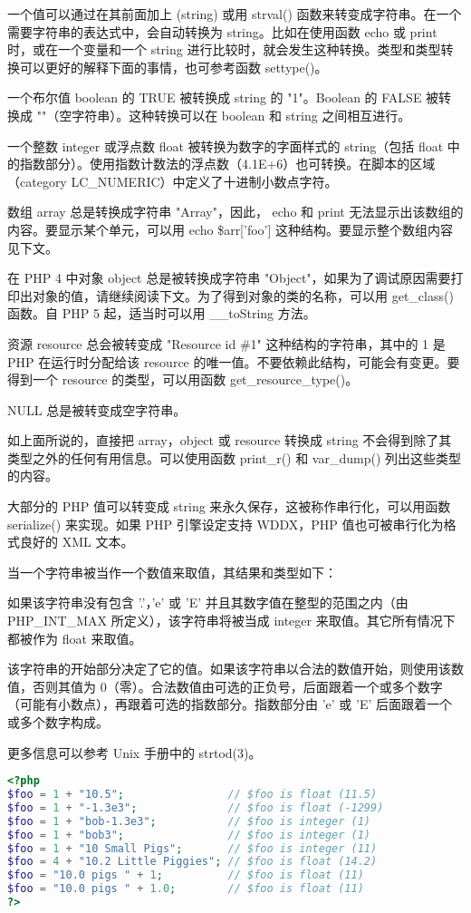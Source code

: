 一个值可以通过在其前面加上 (string) 或用 strval() 函数来转变成字符串。在一个需要字符串的表达式中，会自动转换为 string。比如在使用函数 echo 或 print 时，或在一个变量和一个 string 进行比较时，就会发生这种转换。类型和类型转换可以更好的解释下面的事情，也可参考函数 settype()。

一个布尔值 boolean 的 TRUE 被转换成 string 的 "1"。Boolean 的 FALSE 被转换成 ""（空字符串）。这种转换可以在 boolean 和 string 之间相互进行。

一个整数 integer 或浮点数 float 被转换为数字的字面样式的 string（包括 float 中的指数部分）。使用指数计数法的浮点数（4.1E+6）也可转换。在脚本的区域（category LC\_NUMERIC）中定义了十进制小数点字符。

数组 array 总是转换成字符串 "Array"，因此， echo 和 print 无法显示出该数组的内容。要显示某个单元，可以用 echo \$arr['foo'] 这种结构。要显示整个数组内容见下文。

在 PHP 4 中对象 object 总是被转换成字符串 "Object"，如果为了调试原因需要打印出对象的值，请继续阅读下文。为了得到对象的类的名称，可以用 get\_class() 函数。自 PHP 5 起，适当时可以用 \_\_toString 方法。

资源 resource 总会被转变成 "Resource id \#1" 这种结构的字符串，其中的 1 是 PHP 在运行时分配给该 resource 的唯一值。不要依赖此结构，可能会有变更。要得到一个 resource 的类型，可以用函数 get\_resource\_type()。

NULL 总是被转变成空字符串。

如上面所说的，直接把 array，object 或 resource 转换成 string 不会得到除了其类型之外的任何有用信息。可以使用函数 print\_r() 和 var\_dump() 列出这些类型的内容。

大部分的 PHP 值可以转变成 string 来永久保存，这被称作串行化，可以用函数 serialize() 来实现。如果 PHP 引擎设定支持 WDDX，PHP 值也可被串行化为格式良好的 XML 文本。

当一个字符串被当作一个数值来取值，其结果和类型如下：

如果该字符串没有包含 '.'，'e' 或 'E' 并且其数字值在整型的范围之内（由 PHP\_INT\_MAX 所定义），该字符串将被当成 integer 来取值。其它所有情况下都被作为 float 来取值。

该字符串的开始部分决定了它的值。如果该字符串以合法的数值开始，则使用该数值，否则其值为 0（零）。合法数值由可选的正负号，后面跟着一个或多个数字（可能有小数点），再跟着可选的指数部分。指数部分由 'e' 或 'E' 后面跟着一个或多个数字构成。

更多信息可以参考 Unix 手册中的 strtod(3)。



\begin{lstlisting}[language=PHP]
<?php
$foo = 1 + "10.5";                // $foo is float (11.5)
$foo = 1 + "-1.3e3";              // $foo is float (-1299)
$foo = 1 + "bob-1.3e3";           // $foo is integer (1)
$foo = 1 + "bob3";                // $foo is integer (1)
$foo = 1 + "10 Small Pigs";       // $foo is integer (11)
$foo = 4 + "10.2 Little Piggies"; // $foo is float (14.2)
$foo = "10.0 pigs " + 1;          // $foo is float (11)
$foo = "10.0 pigs " + 1.0;        // $foo is float (11)     
?>
\end{lstlisting}

